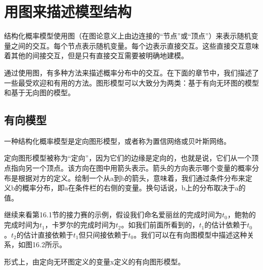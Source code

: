 \section{用图来描述模型结构}
结构化概率模型使用图（在图论意义上由边连接的“节点”或“顶点”）来表示随机变量之间的交互。每个节点表示随机变量。每个边表示直接交互。这些直接交互意味着其他的间接交互，但是只有直接交互需要被明确地建模。

通过使用图，有多种方法来描述概率分布中的交互。在下面的章节中，我们描述了一些最受欢迎和有用的方法。图形模型可以大致分为两类：基于有向无环图的模型和基于无向图的模型。

\subsection{有向模型}
一种结构化概率模型是定向图形模型，或者称为置信网络或贝叶斯网络。

定向图形模型被称为“定向”，因为它们的边缘是定向的，也就是说，它们从一个顶点指向另一个顶点。该方向在图中用箭头表示。箭头的方向表示哪个变量的概率分布是根据对方的定义。绘制一个从a到b的箭头，意味着，我们通过条件分布来定义b的概率分布，即a在条件栏的右侧的变量。换句话说，b上的分布取决于a的值。

继续来看第16.1节的接力赛的示例，假设我们命名爱丽丝的完成时间为$t_0$，鲍勃的完成时间为$t_1$，卡罗尔的完成时间为$t_2$。如我们前面所看到的，$t_1$的估计依赖于$t_0$。$t_2$的估计直接依赖于$t_1$但只间接依赖于$t_0$。我们可以在有向图模型中描述这种关系，如图16.2所示。

形式上，由定向无环图定义的变量x定义的有向图形模型。